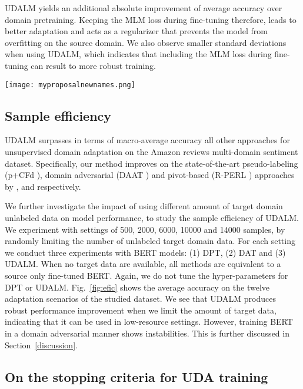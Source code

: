 \documentclass[11pt]{article}
\begin{document}
UDALM yields an additional  absolute improvement of average accuracy over domain pretraining. Keeping the MLM loss during fine-tuning therefore, leads to better adaptation and acts as a regularizer that prevents the model from overfitting on the source domain. We also observe smaller standard deviations when using UDALM, which indicates that including the MLM loss during fine-tuning can result to more robust training.

\begin{figure*}[t]
\centering
\texttt{[image: myproposalnewnames.png]}
\caption{Average accuracy for different amount of target domain unlabeled samples of: (1) DPT BERT (2) DAT BERT and (3) UDALM.}
\label{fig:efic}
\end{figure*}
\subsection{Sample efficiency}
\label{sec:sample-eff}

UDALM surpasses in terms of macro-average accuracy all other approaches for unsupervised domain adaptation on the Amazon reviews multi-domain sentiment dataset.
Specifically, our method improves on the state-of-the-art pseudo-labeling (p+CFd \citealp{ye_feature_2020}), domain adversarial (DAAT \citealp{du-etal-2020-adversarial}) and pivot-based (R-PERL \citealp{ben2020perl}) approaches by ,  and  respectively.



We further investigate the impact of using different amount of target domain unlabeled data on model performance, to study the sample efficiency of UDALM. We experiment with settings of 500, 2000, 6000, 10000 and 14000 samples, by randomly limiting the number of unlabeled target domain data. For each setting we conduct three experiments with BERT models: (1) DPT, (2) DAT and (3) UDALM. When no target data are available, all methods are equivalent to a source only fine-tuned BERT. Again, we do not tune the hyper-parameters for DPT or UDALM. Fig.~\ref{fig:efic} shows the average accuracy on the twelve adaptation scenarios of the studied dataset. We see that UDALM produces robust performance improvement when we limit the amount of target data, indicating that it can be used in low-resource settings. However, training BERT in a domain adversarial manner shows instabilities. This is further discussed in Section~\ref{discussion}. 

\subsection{On the stopping criteria for UDA training}
\end{document}
